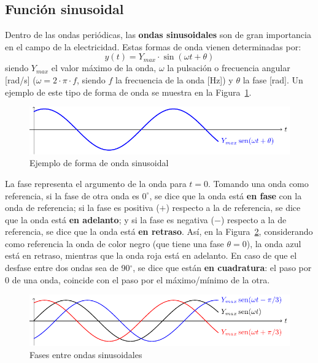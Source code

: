 \subsection{Función sinusoidal}\label{sec:sinusoidal}
Dentro de las ondas periódicas, las \textbf{ondas sinusoidales} son de
gran importancia en el campo de la electricidad. Estas formas de onda
vienen determinadas por:
\begin{equation}\label{eq:y_senoidal}
  \boxed{y(t)=Y_{max}\cdot\sin(\omega t+\theta)} 
\end{equation}
siendo $Y_{max}$ el valor máximo de la onda, $\omega$ la pulsación o
frecuencia angular [rad/s] ($\omega=2\cdot\pi\cdot f$, siendo $f$ la
frecuencia de la onda [Hz]) y $\theta$ la fase [rad]. Un ejemplo de
este tipo de forma de onda se muestra en la Figura~\ref{fig:sin}.
\begin{figure}[H]
  \centering \includegraphics[width=.9\linewidth]{../figs/sin.pdf}
  \caption{Ejemplo de forma de onda sinusoidal}
  \label{fig:sin}
\end{figure}
	
La fase representa el argumento de la onda para $t=0$. Tomando una
onda como referencia, si la fase de otra onda es $0^\circ$, se dice
que la onda está \textbf{en fase} con la onda de referencia; si la
fase es positiva ($+$) respecto a la de referencia, se dice que la
onda está \textbf{en adelanto}; y si la fase es negativa ($-$)
respecto a la de referencia, se dice que la onda está \textbf{en
  retraso}. Así, en la Figura~\ref{fig:desfase}, considerando como
referencia la onda de color negro (que tiene una fase $\theta=0$), la
{\color{blue} onda azul} está en retraso, mientras que la {\color{red}
  onda roja} está en adelanto. En caso de que el desfase entre dos
ondas sea de 90$^\circ$, se dice que están \textbf{en cuadratura}: el
paso por 0 de una onda, coincide con el paso por el máximo/mínimo de
la otra.
\begin{figure}[H]
  \centering \includegraphics[width=.9\linewidth]{../figs/desfase.pdf}
  \caption{Fases entre ondas sinusoidales}
  \label{fig:desfase}
\end{figure}
	
